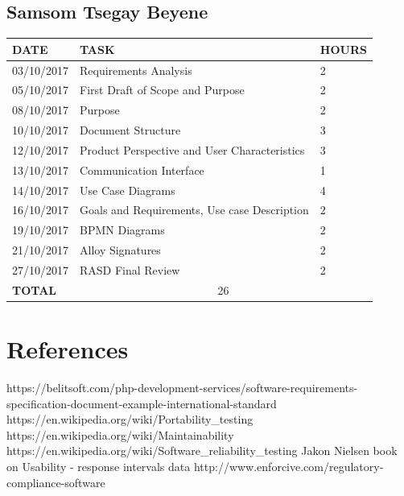 \documentclass[12pt]{article}
\begin{document}
\subsection{Samsom Tsegay Beyene}

\begin{center}
\begin{tabular}{ |p{}|p{}|p{}| } 
 \hline
 \textbf{DATE} & \textbf{TASK} & \textbf{HOURS} \\ 
  \hline
 03/10/2017 & Requirements Analysis & 2 \\ 
 \hline
 05/10/2017 & First Draft of Scope and Purpose & 2 \\
 \hline
 08/10/2017 & Purpose & 2 \\
 \hline
 10/10/2017 & Document Structure & 3 \\
 \hline
 12/10/2017 & Product Perspective and User Characteristics & 3 \\
 \hline
 13/10/2017 & Communication Interface & 1 \\
 \hline
 14/10/2017 & Use Case Diagrams & 4 \\
 \hline
 16/10/2017 & Goals and Requirements, Use case Description & 2 \\
 \hline
 19/10/2017 & BPMN Diagrams & 2 \\
 \hline
 21/10/2017 & Alloy Signatures & 2 \\
 \hline
 27/10/2017 & RASD Final Review & 2 \\
  \hline
  \textbf{TOTAL} & \multicolumn{2}{c|}{26} \\ 
  \hline
\end{tabular}
\end{center}

\section{References}
https://belitsoft.com/php-development-services/software-requirements-specification-document-example-international-standard\\
https://en.wikipedia.org/wiki/Portability_testing\\
https://en.wikipedia.org/wiki/Maintainability\\
https://en.wikipedia.org/wiki/Software_reliability_testing
Jakon Nielsen book on Usability - response intervals data 
http://www.enforcive.com/regulatory-compliance-software
\end{document}
